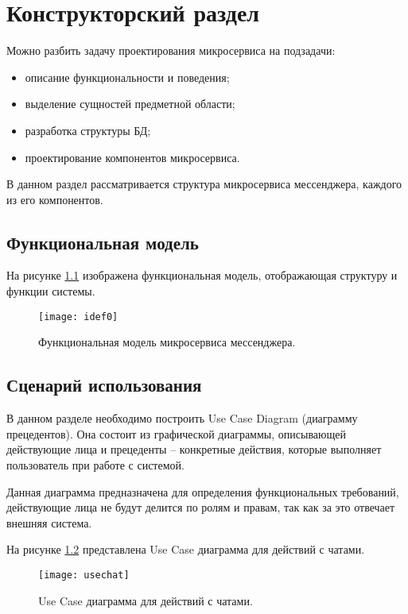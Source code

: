 \chapter{\textbf{Конструкторский раздел}}

\hfill

Можно разбить задачу проектирования микросервиса на подзадачи:
\begin{itemize}
\item описание функциональности и поведения;
\item выделение сущностей предметной области;
\item разработка структуры БД;
\item проектирование компонентов микросервиса.
\end{itemize}

В данном раздел рассматривается структура микросервиса мессенджера, каждого из его компонентов. 

\section{\textbf{Функциональная модель}}

\hfill

На рисунке \ref{img:idef0} изображена функциональная модель, отобра­жающая структуру и функции системы.

\begin{figure}[H]
	\centering
	\texttt{[image: idef0]}
	\caption{Функциональная модель микросервиса мессенджера. }
	\label{img:idef0}
\end{figure}

\section{\textbf{Сценарий использования}}

\hfill

В данном разделе необходимо построить Use Case Diagram (диаграмму прецедентов). Она состоит из графической диаграммы, описывающей действующие лица и прецеденты -- конкретные действия, которые выполняет пользователь при работе с системой. 

Данная диаграмма предназначена для определения функциональных требований, действующие лица не будут делится по ролям и правам, так как за это отвечает внешняя система. 

На рисунке \ref{img:usechat} представлена Use Case диаграмма для действий с чатами. 

\begin{figure}[H]
	\centering
	\texttt{[image: usechat]}
	\caption{Use Case диаграмма для действий с чатами. }
	\label{img:usechat}
\end{figure}

